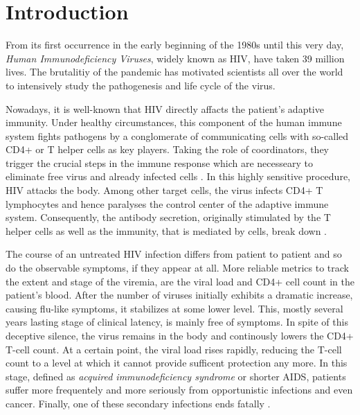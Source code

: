 \section{Introduction}
\label{sec:intro}

From its first occurrence in the early beginning of the 1980s until this very day, 
\textit{Human Immunodeficiency Viruses}, widely known as HIV, have taken 39 million lives.
The brutalitiy of the pandemic has motivated scientists all over the world to intensively study the
pathogenesis and life cycle of the virus.\par

Nowadays, it is well-known that HIV directly affacts the patient’s adaptive immunity.
Under healthy circumstances, this component of the human immune system fights pathogens by a 
conglomerate of communicating cells with so-called CD4+ or T helper cells as key players.
Taking the role of coordinators, they trigger the crucial steps in the immune response which are 
necesseary to eliminate free virus and already infected cells \cite{alberts2002helper}.\newline
In this highly sensitive procedure, HIV attacks the body.
Among other target cells, the virus infects CD4+ T lymphocytes and hence paralyses the control center of the adaptive immune
system.
Consequently, the antibody secretion, originally stimulated by the T helper cells as well as the immunity, that is mediated by cells,
break down \cite{buselmaier2018biologie}.\par

The course of an untreated HIV infection differs from patient to patient and so do the observable symptoms, 
if they appear at all.
More reliable metrics to track the extent and stage of the viremia, are the viral load and CD4+ cell 
count in the patient's blood.
After the number of viruses initially exhibits a dramatic increase, causing flu-like symptoms, it stabilizes at some lower level.
This, mostly several years lasting stage of clinical latency, is mainly free of symptoms.
In spite of this deceptive silence, the virus remains in the body and continously lowers the CD4+ T-cell count.
At a certain point, the viral load rises rapidly, reducing the T-cell count to a level at which it cannot provide 
sufficent protection any more.
In this stage, defined as \textit{acquired immunodeficiency syndrome} or shorter AIDS, patients suffer more frequentely 
and more seriously from opportunistic infections and even cancer.
Finally, one of these secondary infections ends fatally \cite{mittler1998influence}.\par

